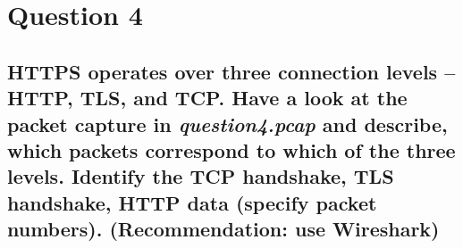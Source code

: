 \documentclass{report}
\begin{document}
	\section{Question 4}
	\startsection
		\renewcommand{\thesubsection}{\thesection.\Alph{subsection}}
		\subsection{HTTPS operates over three connection levels – HTTP, TLS, and TCP. Have a look at the packet capture in \textit{question4.pcap} and describe, which packets correspond to which of the three levels. Identify the TCP handshake, TLS handshake, HTTP data (specify packet numbers). (Recommendation: use Wireshark)}
		\startsubsection
		\closesection
	\closesection
\end{document}
